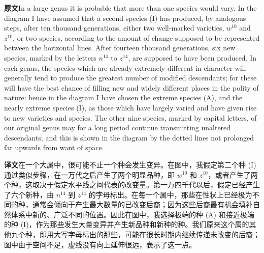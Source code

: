 \documentclass[UTF8,zihao=-4]{ctexart}
\newcommand{\BodyFont}{\fontsize{10.5pt}{15.5pt}\selectfont}
\newcommand{\origlabel}{\textbf{原文}\quad}
\newcommand{\translabel}{\textbf{译文}\quad}
\newenvironment{enblock}{\par\noindent\begingroup\BodyFont\origlabel}{\par\endgroup}
\newenvironment{zhblock}{\par\noindent\begingroup\BodyFont\translabel}{\par\endgroup\vspace{0.35em}}
\newcommand{\pair}[2]{\begin{enblock}#1\end{enblock}\begin{zhblock}#2\end{zhblock}}
\begin{document}
\pair{In a large genus it is probable that more than one species would vary. In the diagram I have assumed that a second species (I) has produced, by analogous steps, after ten thousand generations, either two well-marked varieties, $w^{10}$ and $z^{10}$, or two species, according to the amount of change supposed to be represented between the horizontal lines. After fourteen thousand generations, six new species, marked by the letters $n^{14}$ to $z^{14}$, are supposed to have been produced. In each genus, the species which are already extremely different in character will generally tend to produce the greatest number of modified descendants; for these will have the best chance of filling new and widely different places in the polity of nature: hence in the diagram I have chosen the extreme species (A), and the nearly extreme species (I), as those which have largely varied and have given rise to new varieties and species. The other nine species, marked by capital letters, of our original genus may for a long period continue transmitting unaltered descendants; and this is shown in the diagram by the dotted lines not prolonged far upwards from want of space.}{在一个大属中，很可能不止一个种会发生变异。在图中，我假定第二个种 (I) 通过类似步骤，在一万代之后产生了两个明显品种，即 $w^{10}$ 和 $z^{10}$，或者产生了两个种，这取决于假定水平线之间代表的改变量。第一万四千代以后，假定已经产生了六个新种，由 $n^{14}$ 到 $z^{14}$ 的字母标出。在每一个属中，那些在性状上已经极为不同的种，通常会倾向于产生最大数量的已改变后裔；因为这些后裔最有机会填补自然体系中新的、广泛不同的位置。因此在图中，我选择极端的种 (A) 和接近极端的种 (I)，作为那些发生大量变异并产生新品种和新种的种。我们原来这个属的其他九个种，即用大写字母标出的那些，可能在很长时期内继续传递未改变的后裔；图中由于空间不足，虚线没有向上延伸很远，表示了这一点。}
\end{document}
